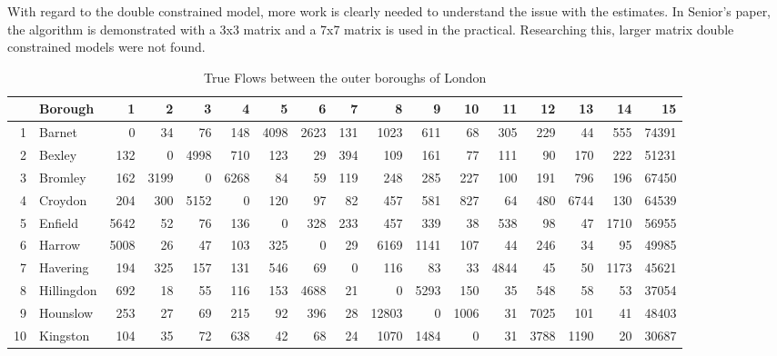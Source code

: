 \documentclass[11pt]{article} %
\begin{document}
With regard to the double constrained model, more work is clearly needed to understand the issue with the estimates. In Senior's paper, the algorithm is demonstrated with a 3x3 matrix and a 7x7 matrix is used in the practical. Researching this, larger matrix double constrained models were not found. 










\begin{table}
\footnotesize
\caption{True Flows between the outer boroughs of London}
\begin{tabular}{|r|l|r|r|r|r|r|r|r|r|r|r|r|r|r|r|r|}
\hline
\multicolumn{1}{|l|}{} & Borough & 1 & 2 & 3 & 4 & 5 & 6 & 7 & 8 & 9 & 10 & 11 & 12 & 13 & 14 & 15 \\ \hline
1 & Barnet & 0 & 34 & 76 & 148 & 4098 & 2623 & 131 & 1023 & 611 & 68 & 305 & 229 & 44 & 555 & 74391 \\ \hline
2 & Bexley & 132 & 0 & 4998 & 710 & 123 & 29 & 394 & 109 & 161 & 77 & 111 & 90 & 170 & 222 & 51231 \\ \hline
3 & Bromley & 162 & 3199 & 0 & 6268 & 84 & 59 & 119 & 248 & 285 & 227 & 100 & 191 & 796 & 196 & 67450 \\ \hline
4 & Croydon & 204 & 300 & 5152 & 0 & 120 & 97 & 82 & 457 & 581 & 827 & 64 & 480 & 6744 & 130 & 64539 \\ \hline
5 & Enfield & 5642 & 52 & 76 & 136 & 0 & 328 & 233 & 457 & 339 & 38 & 538 & 98 & 47 & 1710 & 56955 \\ \hline
6 & Harrow & 5008 & 26 & 47 & 103 & 325 & 0 & 29 & 6169 & 1141 & 107 & 44 & 246 & 34 & 95 & 49985 \\ \hline
7 & Havering & 194 & 325 & 157 & 131 & 546 & 69 & 0 & 116 & 83 & 33 & 4844 & 45 & 50 & 1173 & 45621 \\ \hline
8 & Hillingdon & 692 & 18 & 55 & 116 & 153 & 4688 & 21 & 0 & 5293 & 150 & 35 & 548 & 58 & 53 & 37054 \\ \hline
9 & Hounslow & 253 & 27 & 69 & 215 & 92 & 396 & 28 & 12803 & 0 & 1006 & 31 & 7025 & 101 & 41 & 48403 \\ \hline
10 & Kingston & 104 & 35 & 72 & 638 & 42 & 68 & 24 & 1070 & 1484 & 0 & 31 & 3788 & 1190 & 20 & 30687 \\ \hline

\end{tabular}
\end{table}
\end{document}
